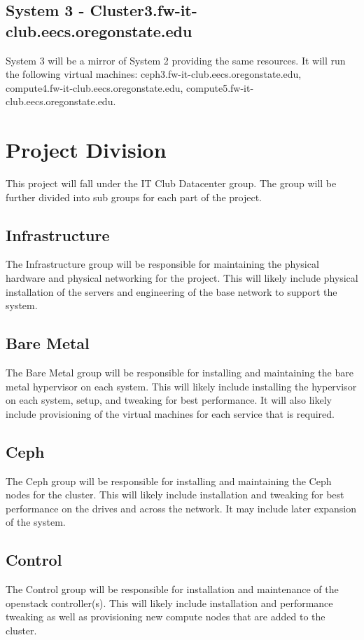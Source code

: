 \documentclass[12pt]{article}
\begin{document}
\subsection{System 3 - Cluster3.fw-it-club.eecs.oregonstate.edu}
System 3 will be a mirror of System 2 providing the same resources. It will run the following virtual machines: ceph3.fw-it-club.eecs.oregonstate.edu, compute4.fw-it-club.eecs.oregonstate.edu,
compute5.fw-it-club.eecs.oregonstate.edu.


\section{Project Division}
This project will fall under the IT Club Datacenter group. The group will be further divided into sub groups for each part of the project.

\subsection{Infrastructure}
The Infrastructure group will be responsible for maintaining the physical hardware and physical networking for the project. This will likely
include physical installation of the servers and engineering of the base network to support the system.

\subsection{Bare Metal}
The Bare Metal group will be responsible for installing and maintaining the bare metal hypervisor on each system. This will likely include
installing the hypervisor on each system, setup, and tweaking for best performance. It will also likely include provisioning of the virtual
machines for each service that is required. 

\subsection{Ceph}
The Ceph group will be responsible for installing and maintaining the Ceph nodes for the cluster. This will likely include installation
and tweaking for best performance on the drives and across the network. It may include later expansion of the system.

\subsection{Control}
The Control group will be responsible for installation and maintenance of the openstack controller(s). This will likely include installation
and performance tweaking as well as provisioning new compute nodes that are added to the cluster. 
\end{document}
